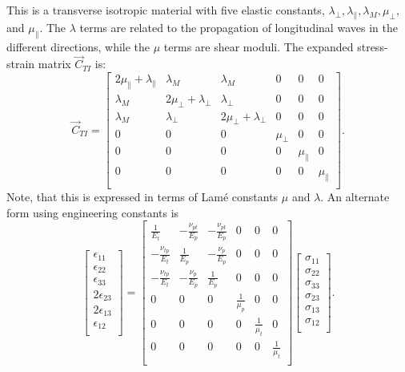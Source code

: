 This is a transverse isotropic material with five elastic constants, $\lambda_{\perp}, \lambda_{\parallel}, \lambda_M, \mu_{\perp},$ and $\mu_{\parallel}$.
The $\lambda$ terms are related to the propagation of longitudinal waves in the different directions, while the $\mu$ terms are shear moduli.
The expanded stress-strain matrix $\Vec{C}_{TI}$ is:
\begin{equation*}
  \Vec{C}_{TI} = \begin{bmatrix}
    2\mu_{\parallel} + \lambda_{\parallel}& \lambda_M & \lambda_M & 0 & 0 & 0\\
  \lambda_M & 2 \mu_{\perp} + \lambda_{\perp} & \lambda_{\perp} & 0 & 0 & 0\\
  \lambda_M & \lambda_{\perp} & 2\mu_{\perp} + \lambda_{\perp} & 0 & 0 & 0\\
  0 & 0 & 0 & \mu_{\perp} & 0 & 0\\
  0 & 0 & 0 & 0 & \mu_{\parallel} & 0\\
  0 & 0 & 0 & 0 & 0 & \mu_{\parallel}\\
  \end{bmatrix}
.\end{equation*}
Note, that this is expressed in terms of Lamé constants $\mu$ and $\lambda$.
An alternate form using engineering constants is
\begin{equation*}
  \begin{bmatrix}
    \epsilon_{11}\\
  \epsilon_{22}\\
  \epsilon_{33}\\
  2\epsilon_{23}\\
  2\epsilon_{13}\\
  \epsilon_{12}\\
  \end{bmatrix} = \begin{bmatrix}
    \frac{1}{E_t} &  - \frac{\nu_{pt}}{E_{p}} & - \frac{\nu_{pt}}{E_p} & 0 & 0 & 0\\
  - \frac{\nu_{tp}}{E_t} & \frac{1}{E_p} & - \frac{\nu_p}{E_p} & 0 & 0 & 0\\
  - \frac{\nu_{tp}}{E_t} & - \frac{\nu_p}{E_p} & \frac{1}{E_p} & 0 & 0 & 0\\
  0 & 0 & 0 & \frac{1}{\mu_p} & 0 & 0\\
  0 & 0 & 0 & 0 & \frac{1}{\mu_t} & 0\\
  0 & 0 & 0 & 0 & 0 & \frac{1}{\mu_t}\\
  \end{bmatrix} \begin{bmatrix}
    \sigma_{11}\\
  \sigma_{22}\\
  \sigma_{33}\\
  \sigma_{23}\\
  \sigma_{13}\\
  \sigma_{12}\\
  \end{bmatrix}
.\end{equation*}

